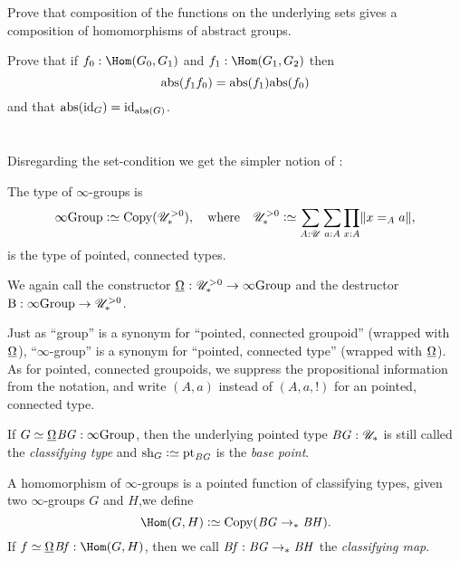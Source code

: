 \begin{xca}
Prove that composition of the functions on the underlying sets gives a composition of homomorphisms of abstract groups.

  Prove that if $f_0:\Hom(G_0,G_1)$ and $f_1:\Hom(G_1,G_2)$ then
$$\mathrm{abs}(f_1f_0)=\mathrm{abs}(f_1)\mathrm{abs}(f_0)$$ and that $\mathrm{abs}(\mathord{\mathrm{id}}_G)=\mathord{\mathrm{id}}_{\mathrm{abs}(G)}$.
\end{xca}



\section{\texorpdfstring{\inftygps}{∞-groups}}
\label{sec:inftygps}

Disregarding the set-condition we get the simpler notion of \inftygps:
\begin{definition}\label{def:inftygps}
  The type of $\infty$-groups is
  \[
    \typeinftygp\defequi \Copy(\UUpconn),
    \quad\text{where}\quad
    \UUpconn\defeq \sum_{A:\UU}\sum_{a:A}\prod_{x:A}\Trunc{x=_Aa},
  \]
  is the type of pointed, connected types.

  We again call the constructor $\mkgroup : \UUpconn \to \typeinftygp$
  and the destructor $\mathrm{B} : {\infty}\mathrm{Group} \to {\mathscr{U}}_\ast^{>0}$.
\end{definition}

\begin{remark}\label{rem:pointedtypes}
  Just as ``group'' is a synonym for ``pointed, connected groupoid''
  (wrapped with $\mkgroup$),
  ``$\infty$-group'' is a synonym for ``pointed, connected type''
  (wrapped with $\mkgroup$).
  As for pointed, connected groupoids,
  we suppress the propositional information from the notation,
  and write $(A,a)$ instead of $(A,a,!)$ for an pointed, connected type.
\end{remark}

\begin{definition}\label{def:classifyingspace}
  If $G \jdeq \mkgroup\BG:\typeinftygp$,
  then the underlying pointed type $\mathit{B}\mathit{G} : {\mathscr{U}_*}$
  is still called the  \emph{classifying type} and $\shape_G\defequi \pt_{\BG}$
  is the \emph{base point}.
\end{definition}
\begin{definition}
  A homomorphism of $\infty$-groups is a pointed function of classifying types, \ie
  given two $\infty$-groups $G$ and $H$,we define
  \[
    \Hom(G,H)\defequi\Copy(\BG\ptdto\BH).
  \]
  If $f \jdeq \mkhom\Bf: \Hom(G,H)$, then we call
  $\mathit{B}\mathit{f} : \mathit{B}\mathit{G}\to_\ast\mathit{B}\mathit{H}$ the \emph{classifying map}.
\end{definition}

